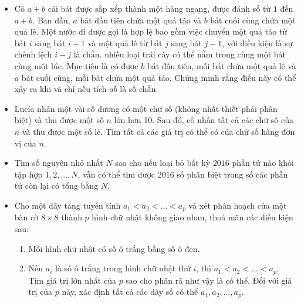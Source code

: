 \documentclass[11pt]{scrartcl}
\begin{document}
\begin{itemize}[label=, leftmargin=0em, itemsep=-0em]
    \item \begin{btvn}
        Có $a+b$ cái bát được sắp xếp thành một hàng ngang, được đánh số từ $1$ đến $a+b$. Ban đầu, $a$ bát đầu tiên chứa một quả táo và $b$ bát cuối cùng chứa một quả lê.
        Một nước đi được gọi là hợp lệ bao gồm việc chuyển một quả táo từ bát $i$ sang bát $i+1$ và một quả lê từ bát $j$ sang bát $j-1$, với điều kiện là sự chênh lệch $i-j$ là chẵn. nhiều loại trái cây có thể nằm trong cùng một bát cùng một lúc. Mục tiêu là có được $b$ bát đầu tiên, mỗi bát chứa một quả lê và $a$ bát cuối cùng, mỗi bát chứa một quả táo. Chứng minh rằng điều này có thể xảy ra khi và chỉ nếu tích $ab$ là số chẵn.
    \end{btvn}

    \item \begin{btvn}
    Lucía nhân một vài số dương có một chữ số (không nhất thiết phải phân biệt) và thu được một số $n$ lớn hơn 10. Sau đó, cô nhân tất cả các chữ số của $n$ và thu được một số lẻ. Tìm tất cả các giá trị có thể có của chữ số hàng đơn vị của $n$.        
    \end{btvn}

    \item \begin{btvn}
        Tìm số nguyên nhỏ nhất $N$ sao cho nếu loại bỏ bất kỳ $2016$ phần tử nào khỏi tập hợp ${1, 2,...,N}$, vẫn có thể tìm được $2016$ số phân biệt trong số các phần tử còn lại có tổng bằng $N$.
    \end{btvn}

    \item \begin{btvn}
    Cho một dãy tăng tuyến tính $a_1 < a_2 <\dots< a_p$ và xét phân hoạch của một bàn cờ $8\times 8$ thành $p$ hình chữ nhật không giao nhau, thoả mãn các điều kiện sau:

    \begin{enumerate}
        \item Mỗi hình chữ nhật có số ô trắng bằng số ô đen.
        \item Nếu $a_i$ là số ô trắng trong hình chữ nhật thứ $i$, thì $a_1<a_2<\ldots <a_p$.
        Tìm giá trị lớn nhất của $p$ sao cho phân rã như vậy là có thể. Đối với giá trị của $p$ này, xác định tất cả các dãy số có thể $a_1,a_2,\ldots ,a_p$.
    \end{enumerate}
    \end{btvn}


\end{itemize}
\end{document}
